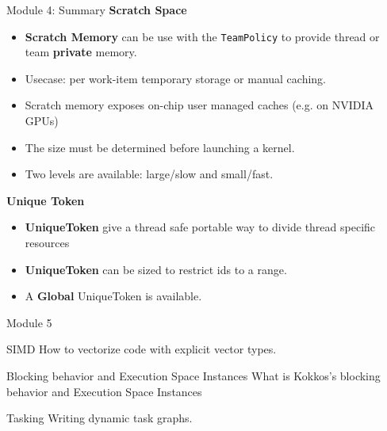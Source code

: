 \begin{frame}[fragile]{Module 4: Summary}
   \textbf{Scratch Space}
\begin{itemize}
    \item{\textbf{Scratch Memory} can be use with the \texttt{TeamPolicy} to provide thread or team \textbf{private} memory.}
    \item{Usecase: per work-item temporary storage or manual caching.}
    \item{Scratch memory exposes on-chip user managed caches (e.g. on NVIDIA GPUs)}
    \item{The size must be determined before launching a kernel.}
    \item{Two levels are available: large/slow and small/fast.}
  \end{itemize}
  \textbf{Unique Token}
  \begin{itemize}
    \item{\textbf{UniqueToken} give a thread safe portable way to divide thread specific resources}
    \item{\textbf{UniqueToken} can be sized to restrict ids to a range.}
    \item{A \textbf{Global} UniqueToken is available.}
  \end{itemize}

\end{frame}

\begin{frame}{Module 5}
  \begin{block}{SIMD}
    How to vectorize code with explicit vector types.
  \end{block}

  \begin{block}{Blocking behavior and Execution Space Instances}
    What is Kokkos's blocking behavior and Execution Space Instances
  \end{block}

  \begin{block}{Tasking}
    Writing dynamic task graphs.
  \end{block}
\end{frame}




%

